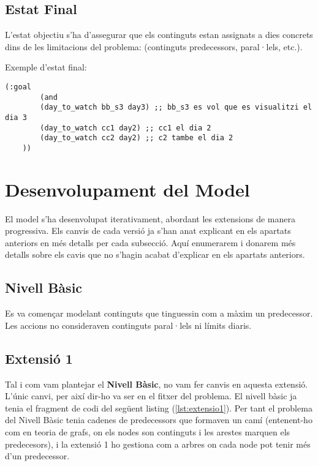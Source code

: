 \documentclass[a4paper]{article}
\begin{document}
	\subsection{Estat Final}
	
	L'estat objectiu s’ha d’assegurar que els continguts estan assignats a dies concrets dins de les limitacions del problema: (continguts predecessors, paral·lels, etc.).
	
	Exemple d’estat final:
	
	\begin{lstlisting}[language=PDDL, caption={Exemple de \textit{goal} del problema}, label={lst:goal_problema}]
	(:goal
		(and
		(day_to_watch bb_s3 day3) ;; bb_s3 es vol que es visualitzi el dia 3
		(day_to_watch cc1 day2) ;; cc1 el dia 2
		(day_to_watch cc2 day2) ;; c2 tambe el dia 2
	))
	\end{lstlisting}
	
	\newpage
	\section{Desenvolupament del Model}
	
	El model s'ha desenvolupat iterativament, abordant les extensions de manera progressiva. Els canvis de cada versió ja s'han anat explicant en els apartats anteriors en més detalls per cada subsecció. Aquí enumerarem i donarem més detalls sobre els cavis que no s'hagin acabat d'explicar en els apartats anteriors.
	
	\subsection{Nivell Bàsic}
	
	Es va començar modelant continguts que tinguessin com a màxim un predecessor. Les accions no consideraven continguts paral·lels ni límits diaris.
	
	\subsection{Extensió 1}
	
	Tal i com vam plantejar el \textbf{Nivell Bàsic}, no vam fer canvis en aquesta extensió. L'únic canvi, per així dir-ho va ser en el fitxer del problema. El nivell bàsic ja tenia el fragment de codi del següent listing (\ref{lst:extensio1}). Per tant el problema del Nivell Bàsic tenia cadenes de predecessors que formaven un camí (entenent-ho com en teoria de grafs, on els nodes son continguts i les arestes marquen els predecesors), i la extensió 1 ho gestiona com a arbres on cada node pot tenir més d'un predecessor. \\
	
\end{document}

